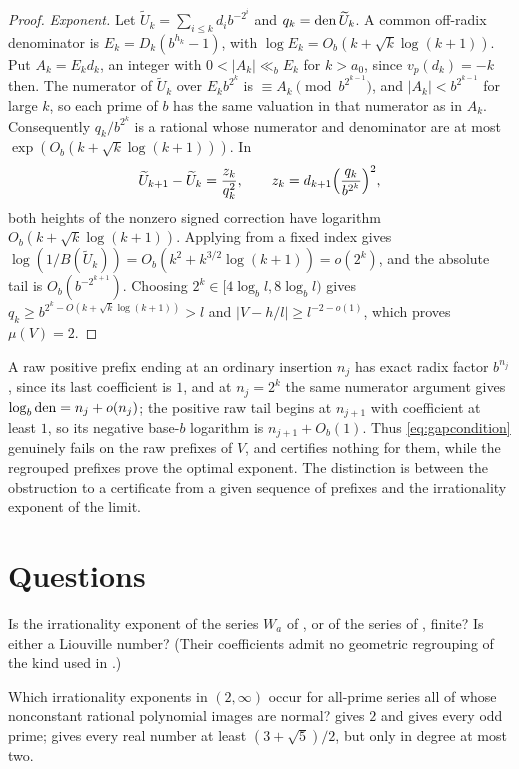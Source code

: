 \documentclass[11pt]{article}
\begin{document}
\begin{proof}
\emph{Exponent.} Let $\widetilde U_k=\sum_{i\le k}d_ib^{-2^i}$ and $q_k=\operatorname{den}\widetilde U_k$. A common off-radix denominator is
$E_k=D_k(b^{h_k}-1)$, with $\log E_k=O_b(k+\sqrt k\log(k+1))$. Put $A_k=E_kd_k$, an integer with $0<|A_k|\ll_bE_k$ for $k>a_0$, since
$v_p(d_k)=-k$ then. The numerator of $\widetilde U_k$ over $E_kb^{2^k}$ is $\equiv A_k\pmod{b^{2^{k-1}}}$, and $|A_k|<b^{2^{k-1}}$ for large $k$, so
each prime of $b$ has the same valuation in that numerator as in $A_k$. Consequently $q_k/b^{2^k}$ is a rational whose numerator
and denominator are at most $\exp(O_b(k+\sqrt k\log(k+1)))$. In
\[
\widetilde U_{k+1}-\widetilde U_k=\frac{z_k}{q_k^2},\qquad z_k=d_{k+1}\Bigl(\frac{q_k}{b^{2^k}}\Bigr)^2,
\]
both heights of the nonzero signed correction have logarithm $O_b(k+\sqrt k\log(k+1))$. Applying  from a
fixed index gives $\log(1/B(\widetilde U_k))=O_b(k^2+k^{3/2}\log(k+1))=o(2^k)$, and the absolute tail is $O_b(b^{-2^{k+1}})$. Choosing
$2^k\in[4\log_bl,8\log_bl)$ gives $q_k\ge b^{2^k-O(k+\sqrt k\log(k+1))}>l$ and $|V-h/l|\ge l^{-2-o(1)}$, which proves $\mu(V)=2$.
\end{proof}

A raw positive prefix ending at an ordinary insertion $n_j$ has exact radix factor $b^{n_j}$, since its last coefficient is $1$,
and at $n_j=2^k$ the same numerator argument gives $\log_b\operatorname{den}=n_j+o(n_j)$; the positive raw tail begins at $n_{j+1}$ with
coefficient at least $1$, so its negative base-$b$ logarithm is $n_{j+1}+O_b(1)$. Thus \eqref{eq:gapcondition} genuinely fails on the
raw prefixes of $V$, and  certifies nothing for them, while the regrouped prefixes prove the optimal
exponent. The distinction is between the obstruction to a certificate from a given sequence of prefixes and the irrationality
exponent of the limit.

\section{Questions}\label{sec:questions}

\begin{question}\label{q:ratioone}
Is the irrationality exponent of the series $W_a$ of , or of the series of , finite?
Is either a Liouville number? (Their coefficients admit no geometric regrouping of the kind used in .)
\end{question}

\begin{question}
Which irrationality exponents in $(2,\infty)$ occur for all-prime series all of whose nonconstant rational polynomial images are
normal?  gives $2$ and  gives every odd prime;  gives every real number
at least $(3+\sqrt5)/2$, but only in degree at most two.
\end{question}
\end{document}
